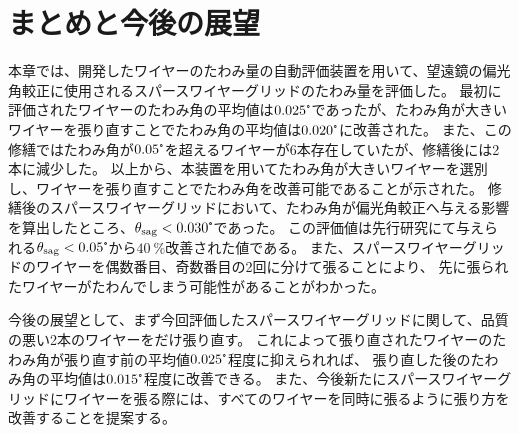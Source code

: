 \documentclass[../../main.tex]{subfiles}
\begin{document}
\section{まとめと今後の展望}
本章では、開発したワイヤーのたわみ量の自動評価装置を用いて、望遠鏡の偏光角較正に使用されるスパースワイヤーグリッドのたわみ量を評価した。
最初に評価されたワイヤーのたわみ角の平均値は$0.025\tcdegree$であったが、たわみ角が大きいワイヤーを張り直すことでたわみ角の平均値は$0.020\tcdegree$に改善された。
また、この修繕ではたわみ角が$0.05\tcdegree$を超えるワイヤーが6本存在していたが、修繕後には2本に減少した。
以上から、本装置を用いてたわみ角が大きいワイヤーを選別し、ワイヤーを張り直すことでたわみ角を改善可能であることが示された。
修繕後のスパースワイヤーグリッドにおいて、たわみ角が偏光角較正へ与える影響を算出したところ、$\theta_{\mathrm{sag}}<0.030\tcdegree$であった。
この評価値は先行研究にて与えられる$\theta_{\mathrm{sag}}<0.05\tcdegree$から$\SI{40}{\%}$改善された値である。
また、スパースワイヤーグリッドのワイヤーを偶数番目、奇数番目の2回に分けて張ることにより、
先に張られたワイヤーがたわんでしまう可能性があることがわかった。

今後の展望として、まず今回評価したスパースワイヤーグリッドに関して、品質の悪い2本のワイヤーをだけ張り直す。
これによって張り直されたワイヤーのたわみ角が張り直す前の平均値$0.025\tcdegree$程度に抑えられれば、
張り直した後のたわみ角の平均値は$0.015\tcdegree$程度に改善できる。
また、今後新たにスパースワイヤーグリッドにワイヤーを張る際には、すべてのワイヤーを同時に張るように張り方を改善することを提案する。

\end{document}
